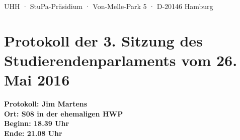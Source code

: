 \documentclass[ngerman,headheight=70pt]{scrartcl}
\begin{document}
    UHH · StuPa-Präsidium · Von-Melle-Park 5 · D-20146 Hamburg

    \section*{Protokoll der 3. Sitzung des Studierendenparlaments vom 26. Mai 2016}

    \textbf{Protokoll: Jim Martens}\\
    \textbf{Ort: S08 in der ehemaligen HWP}\\
    \textbf{Beginn: 18.39 Uhr}\\
    \textbf{Ende: 21.08 Uhr}

    \vspace{0.5cm}
\end{document}
